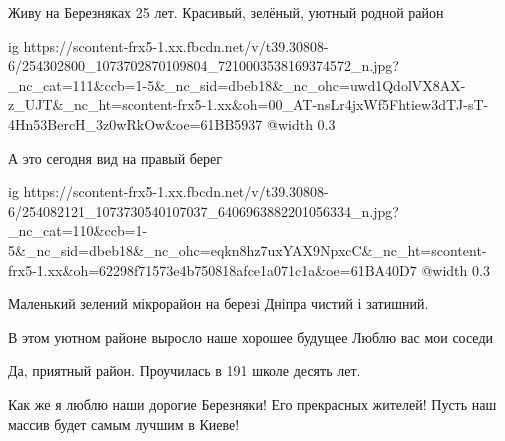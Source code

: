  
 
 
 
 


Живу на Березняках 25 лет. Красивый, зелёный, уютный родной район

\ifcmt
  ig https://scontent-frx5-1.xx.fbcdn.net/v/t39.30808-6/254302800_1073702870109804_7210003538169374572_n.jpg?_nc_cat=111&ccb=1-5&_nc_sid=dbeb18&_nc_ohc=uwd1QdolVX8AX-z_UJT&_nc_ht=scontent-frx5-1.xx&oh=00_AT-nsLr4jxWf5Fhtiew3dTJ-sT-4Hn53BercH_3z0wRkOw&oe=61BB5937
  @width 0.3
\fi

А это сегодня вид на правый берег

\ifcmt
  ig https://scontent-frx5-1.xx.fbcdn.net/v/t39.30808-6/254082121_1073730540107037_6406963882201056334_n.jpg?_nc_cat=110&ccb=1-5&_nc_sid=dbeb18&_nc_ohc=eqkn8hz7uxYAX9NpxcC&_nc_ht=scontent-frx5-1.xx&oh=62298f71573e4b750818afce1a071c1a&oe=61BA40D7
  @width 0.3
\fi


Маленький зелений мікрорайон на березі Дніпра чистий і затишний.


В этом уютном районе выросло наше хорошее будущее Люблю вас мои соседи


Да, приятный район. Проучилась в 191 школе десять лет.


Как же я люблю наши дорогие Березняки! Его прекрасных жителей! Пусть наш массив
будет самым лучшим в Киеве!
